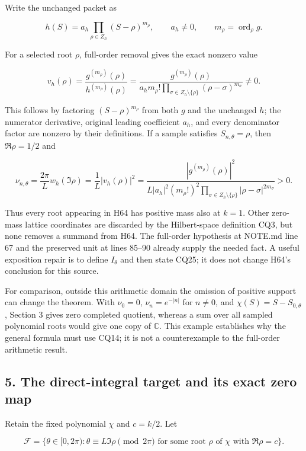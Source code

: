 Write the unchanged packet as

\[
h(S)=a_h\prod_{\rho\in Z_h}(S-\rho)^{m_\rho},
\qquad a_h\ne0,\qquad m_\rho=\operatorname{ord}_\rho g.
\tag{CQ23}
\]

For a selected root \(\rho\), full-order removal gives the exact nonzero value

\[
v_h(\rho)=
\frac{g^{(m_\rho)}(\rho)}{h^{(m_\rho)}(\rho)}=
\frac{g^{(m_\rho)}(\rho)}
{a_hm_\rho!\prod_{\sigma\in Z_h\setminus\{\rho\}}
(\rho-\sigma)^{m_\sigma}}\ne0.
\tag{CQ24}
\]

This follows by factoring \((S-\rho)^{m_\rho}\) from both \(g\) and the unchanged \(h\); the numerator derivative, original leading coefficient \(a_h\), and every denominator factor are nonzero by their definitions. If a sample satisfies \(S_{n,\theta}=\rho\), then \(\Re \rho=1/2\) and

\[
\nu_{n,\theta}
=\frac{2\pi}L w_h(\Im\rho)
=\frac1L|v_h(\rho)|^2
=\frac{|g^{(m_\rho)}(\rho)|^2}
{L|a_h|^2(m_\rho!)^2\prod_{\sigma\in Z_h\setminus\{\rho\}}|\rho-\sigma|^{2m_\sigma}}>0.
\tag{CQ25}
\]

Thus every root appearing in H64 has positive mass also at \(k=1\). Other zero-mass lattice coordinates are discarded by the Hilbert-space definition CQ3, but none removes a summand from H64. The full-order hypothesis at NOTE.md line 67 and the preserved unit at lines 85--90 already supply the needed fact. A useful exposition repair is to define \(I_\theta\) and then state CQ25; it does not change H64's conclusion for this source.

For comparison, outside this arithmetic domain the omission of positive support can change the theorem. With \(\nu_0=0\), \(\nu_n=e^{-|n|}\) for \(n \ne 0\), and \(\chi(S)=S-S_{0,\theta}\), Section 3 gives zero completed quotient, whereas a sum over all sampled polynomial roots would give one copy of \(\mathbb C\). This example establishes why the general formula must use CQ14; it is not a counterexample to the full-order arithmetic result.

\subsection{5. The direct-integral target and its exact zero map}\label{the-direct-integral-target-and-its-exact-zero-map}

Retain the fixed polynomial \(\chi\) and \(c=k/2\). Let

\[
\mathcal F=
\{\theta\in[0,2\pi):
\theta\equiv L\Im\rho\pmod{2\pi}
\text{ for some root }\rho\text{ of }\chi
\text{ with }\Re\rho=c\}.
\tag{CQ26}
\]

